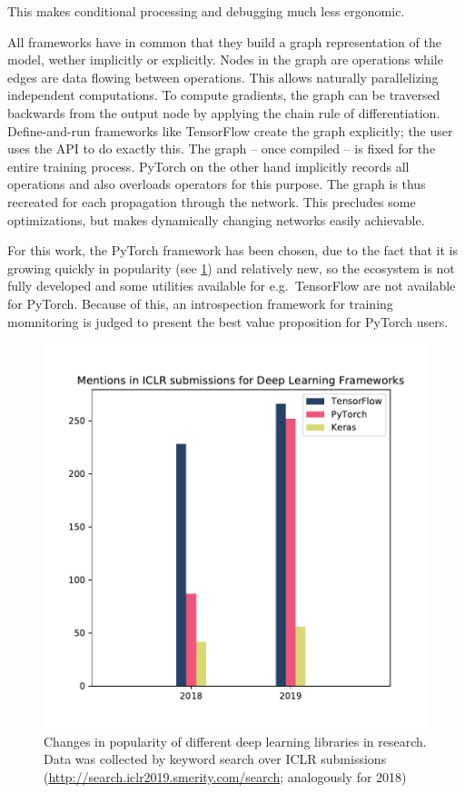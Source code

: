 This makes conditional processing and debugging much less ergonomic.

All frameworks have in common that they build a graph representation of
the model, wether implicitly or explicitly. Nodes in the graph are
operations while edges are data flowing between operations. This allows
naturally parallelizing independent computations. To compute gradients,
the graph can be traversed backwards from the output node by applying
the chain rule of differentiation. Define-and-run frameworks like
TensorFlow create the graph explicitly; the user uses the API to do
exactly this. The graph -- once compiled -- is fixed for the entire
training process. PyTorch on the other hand implicitly records all
operations and also overloads operators for this purpose. The graph is
thus recreated for each propagation through the network. This precludes
some optimizations, but makes dynamically changing networks easily
achievable.

For this work, the PyTorch framework has been chosen, due to the fact
that it is growing quickly in popularity (see \cref{fig:popularity}) and
relatively new, so the ecosystem is not fully developed and some
utilities available for e.g.~TensorFlow are not available for PyTorch.
Because of this, an introspection framework for training momnitoring is
judged to present the best value proposition for PyTorch users.

\begin{figure}
    \hypertarget{fig:popularity}{%
        \centering
        \includegraphics[max width=\textwidth]{gfx/diagrams/framework_popularity/popularity.pdf}
        \caption[Changes in popularity of different deep learning libraries in
        research]{Changes in popularity of different deep learning libraries in
            research. Data was collected by keyword search over ICLR submissions
            (\href{http://search.iclr2019.smerity.com/search/}{http://search.iclr2019.smerity.com/search};
        analogously for 2018)}\label{fig:popularity}
    }
\end{figure}

